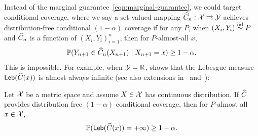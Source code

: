 \documentclass{article}
\begin{document}
Instead of the marginal guarantee~\eqref{eqn:marginal-guarantee}, we could
target conditional coverage, where we say a set valued mapping $\widehat{C}_n :
\mathcal{X} \rightrightarrows \mathcal{Y}$ achieves distribution-free conditional $(1 - \alpha)$
coverage if for any $P$, when $(X_i, Y_i) \stackrel{\rm iid}{\sim} P$ and $\widehat{C}_n$ is a
function of $(X_i, Y_i)_{i = 1}^n$, then for $P$-almost-all $x$,
\begin{equation}
  \label{eqn:x-conditional-coverage}
  \mathbb{P}(Y_{n + 1} \in \widehat{C}_n(X_{n + 1}) \mid X_{n + 1} = x) \ge 1 - \alpha.
\end{equation}
%
This is impossible.
%
For example, when $\mathcal{Y} = \mathbb{R}$,
\citet[Proposition 4]{Vovk12} shows that
the Lebesgue measure $\mathsf{Leb}(\widehat{C}(x))$ is almost always infinite
(see also extensions in~\cite{BarberCaRaTi21a}
and~\cite[Corollary 7.1]{DuchiGuJiSu24}):
\begin{corollary}
  Let $\mathcal{X}$ be a metric space and assume $X \in \mathcal{X}$ has
  continuous distribution.
  If $\widehat{C}$ provides distribution free $(1 - \alpha)$ conditional
  coverage, then for $P$-almost all
  $x \in \mathcal{X}$,
  \begin{equation*}
    \mathbb{P}(\mathsf{Leb}(\widehat{C}(x)) = + \infty) \ge 1 - \alpha.
  \end{equation*}
\end{corollary}
\end{document}
